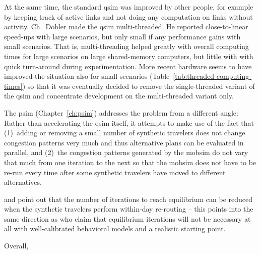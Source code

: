 At the same time, the standard \gls{qsim} was improved by other people, for example by keeping track of active links and not doing any computation on links without activity.  Ch.~Dobler made the \gls{qsim} multi-threaded.  He reported \citep[][Chapter~5]{Dobler_PhDThesis_2013} close-to-linear speed-ups with large scenarios, but only small if any performance gains with small scenarios.  That is, multi-threading helped greatly with overall computing times for large scenarios on large shared-memory computers, but little with with quick turn-around during experimentation.  More recent hardware seems to have improved the situation also for small scenarios (Table~\ref{tab:threaded-computing-times}) so that it was eventually decided to remove the single-threaded variant of the \gls{qsim} and concentrate development on the multi-threaded variant only.  


The \gls{psim} (Chapter~\ref{ch:psim}) addresses the problem from a different angle: Rather than accelerating the \gls{qsim} itself, it attempts to make use of the fact that (1)~adding or removing a small number of synthetic travelers does not change congestion patterns very much and thus alternative plans can be evaluated in parallel, and (2)~the congestion patterns generated by the \gls{mobsim} do not vary that much from one iteration to the next so that the \gls{mobsim} does not have to be re-run every time after some synthetic travelers have moved to different alternatives.

\cite{MaerkiEtAl_Transportation_2014} and \cite{Dobler_PhDThesis_2013} point out that the number of iterations to reach equilibrium can be reduced when the synthetic travelers perform within-day re-routing -- this points into the same direction as \cite{LuEtcBenAkiva2015SimMobility} who claim that equilibrium iterations will not be necessary at all with well-calibrated behavioral models and a realistic starting point.

Overall, 





